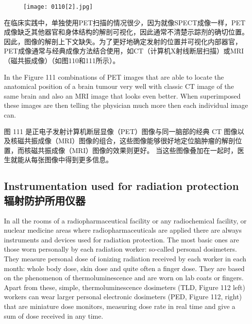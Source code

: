 \documentclass[dvipsnames, svgnames,a4paper,11pt]{article}
\begin{document}
\begin{figure}[H]
    \centering
    \texttt{[image: 0110[2].jpg]}
     \label{fig111}
\end{figure}

在临床实践中，单独使用PET扫描的情况很少，因为就像SPECT成像一样，PET成像缺乏其他器官和身体结构的解剖可视化，因此通常不清楚示踪剂的确切位置。因此，图像的解剖上下文缺失。为了更好地确定发射的位置并可视化内部器官，PET成像通常与经典成像方法结合使用，如CT（计算机X射线断层扫描）或MRI（磁共振成像）（如图110和111所示）。



In the Figure 111 combinations of PET images that are able to locate the anatomical
position of a brain tumour very well with classic CT image of the same brain and also
an MRI image that looks even better. When superimposed these images are then
telling the physician much more then each individual image can.

图 111 是正电子发射计算机断层显像（PET）图像与同一脑部的经典 CT 图像以及核磁共振成像（MRI）图像的组合，这些图像能够很好地定位脑肿瘤的解剖位置，而核磁共振成像（MRI）图像的效果则更好。 当这些图像叠加在一起时，医生就能从每张图像中得到更多信息。

\subsection{Instrumentation used for radiation protection \\辐射防护所用仪器}

In all the rooms of a radiopharmaceutical facility or any radiochemical facility, or
nuclear medicine areas where radiopharmaceuticals are applied there are always
instruments and devices used for radiation protection. The most basic ones are
those worn personally by each radiation worker: so-called personal dosimeters. They
measure personal dose of ionizing radiation received by each worker in each month:
whole body dose, skin dose and quite often a finger dose. They are based on the
phenomenon of thermoluminescence and are worn on lab coats or fingers. Apart
from these, simple, thermoluminescence dosimeters (TLD, Figure 112 left) workers
can wear larger personal electronic dosimeters (PED, Figure 112, right) that are
miniature dose monitors, measuring dose rate in real time and give a sum of dose
received in any time.
\end{document}
